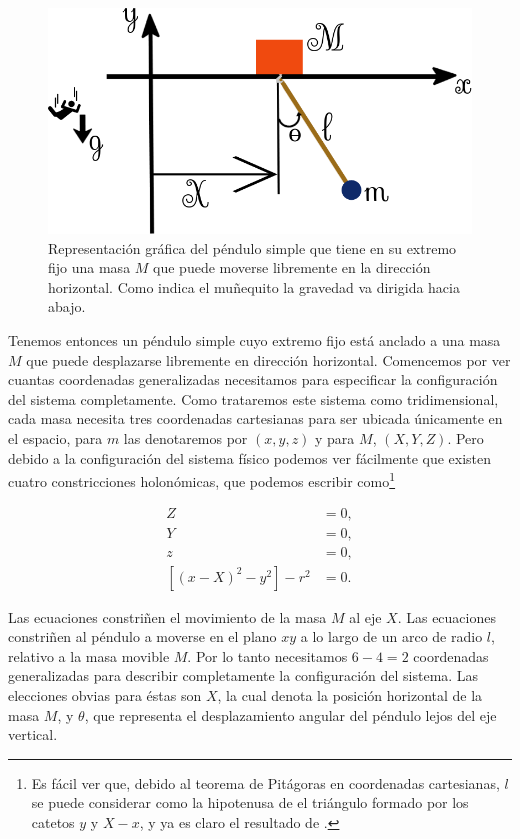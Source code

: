 \documentclass[a4paper,10pt]{article}
\numberwithin{equation}{section}
\begin{document}
\begin{figure}[H]
 \center
 \includegraphics[scale=0.4]{problema3fig1}
 \caption{Representación gráfica del péndulo simple que tiene en su extremo fijo 
 una masa $M$ que puede moverse libremente en la dirección horizontal. Como indica 
 el muñequito la gravedad va dirigida hacia abajo.}
 \label{fig:problema3fig1}
\end{figure}

Tenemos entonces un péndulo simple cuyo extremo fijo está anclado a una masa $M$ que 
puede desplazarse libremente en dirección horizontal. Comencemos por ver cuantas coordenadas
generalizadas necesitamos para especificar la configuración del sistema completamente. 
Como trataremos este sistema como tridimensional, cada masa necesita tres coordenadas 
cartesianas para ser ubicada únicamente en el espacio, para $m$ las denotaremos por 
$(x,y,z)$ y para $M$, $(X,Y,Z)$. Pero debido a la configuración del sistema físico 
podemos ver fácilmente que existen cuatro constricciones holonómicas, que podemos 
escribir como\footnote{Es fácil ver que, debido al teorema de Pitágoras en coordenadas
cartesianas, $l$ se puede considerar como la hipotenusa de el triángulo formado 
por los catetos $y$ y $X-x$, y ya es claro el resultado de .}

\begin{align}
\label{eq:pendu1}
 Z &= 0, \\
\label{eq:pendu2}
 Y &= 0, \\
\label{eq:pendu3}
 z &= 0, \\
\label{eq:pendu4}
 [(x-X)^2 - y^2] - r^2 &= 0.
\end{align}

Las ecuaciones  constriñen el movimiento de la masa $M$ 
al eje $X$. Las ecuaciones  constriñen al péndulo a moverse 
en el plano $xy$ a lo largo de un arco de radio $l$, relativo a la masa movible $M$. Por 
lo tanto necesitamos $6-4 = 2$ coordenadas generalizadas para describir completamente 
la configuración del sistema. Las elecciones obvias para éstas son $X$, la cual denota 
la posición horizontal de la masa $M$, y $\theta$, que representa el desplazamiento 
angular del péndulo lejos del eje vertical.
\end{document}
